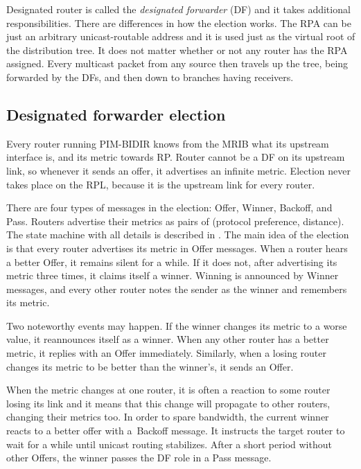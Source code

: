 Designated router is called the \emph{designated forwarder} (DF) and it takes additional
responsibilities. There are differences in how the election works. The RPA can be
just an arbitrary unicast-routable address and it is used just as the virtual root of the
distribution tree. It does not matter whether or not any router has the RPA
assigned. Every multicast packet from any source then travels up the tree,
being forwarded by the DFs, and then down to branches having receivers.

\subsection{Designated forwarder election}

Every router running PIM-BIDIR knows from the MRIB what its upstream interface is,
and its metric towards RP. Router cannot be a DF on its upstream link, so
whenever it sends an offer, it advertises an infinite metric. Election never takes place
on the RPL, because it is the upstream link for every router.

There are four types of messages in the election: Offer, Winner, Backoff, and
Pass. Routers advertise their metrics as pairs of (protocol preference, distance).
The state machine with all details is described in . The main idea of the
election is that every router advertises its metric in Offer messages. When
a router hears a better Offer, it remains silent for a while. If it does not, after
advertising its metric three times, it claims itself a winner. Winning is
announced by Winner messages, and every other router notes the sender as the
winner and remembers its metric.

Two noteworthy events may happen. If the winner changes its metric to a worse value,
it reannounces itself as a winner. When any other router has a better metric,
it replies with an Offer immediately. Similarly, when a losing router changes its
metric to be better than the winner's, it sends an Offer.

When the metric changes at one router, it is often a reaction to some router losing its
link and it means that this change will propagate to other routers, changing their
metrics too. In order to spare bandwidth, the current winner reacts to a better offer
with a~Backoff message. It instructs the target router to wait for a while until
unicast routing stabilizes. After a short period without other Offers, the winner
passes the DF role in a Pass message.


